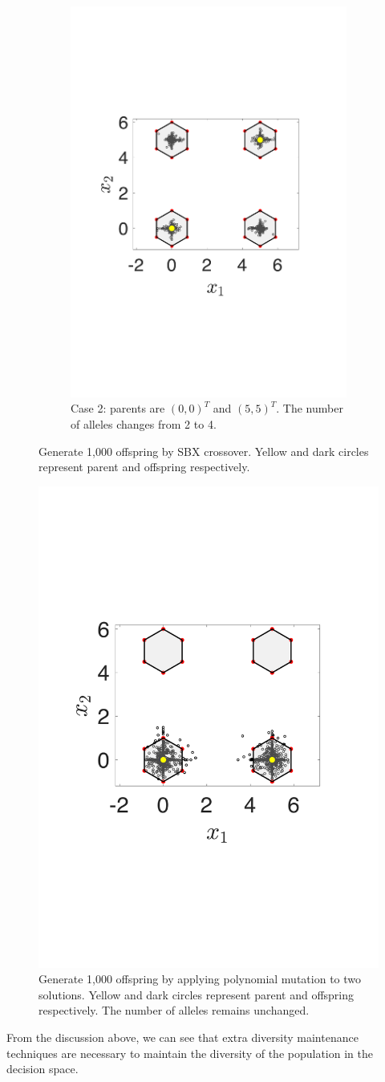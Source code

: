 \documentclass[conference]{IEEEtran}
\begin{document}
\begin{figure}[htbp]
\begin{subfigure}[b]{.24\textwidth}
		\includegraphics[width=\linewidth]{Section3/crossover2}
		\caption{Case 2: parents are $(0, 0)^T$ and $(5, 5)^T$. The number of alleles changes from 2 to 4.}
		\label{fig: SBX crossover case 2}
	\end{subfigure}
	\caption{Generate 1,000 offspring by SBX crossover. Yellow and dark circles represent parent and offspring respectively.}
	\label{fig: SBX crossover}
\end{figure}

\begin{figure}[htbp]
    \centering
    \includegraphics[width=.24\textwidth]{Section3/mutation}
    \caption{Generate 1,000 offspring by applying polynomial mutation to two solutions. Yellow and dark circles represent parent and offspring respectively. The number of alleles remains unchanged.}
    \label{fig: Polynomial mutation}
\end{figure}
From the discussion above, we can see that extra diversity maintenance techniques are necessary to maintain the diversity of the population in the decision space.
\end{document}
